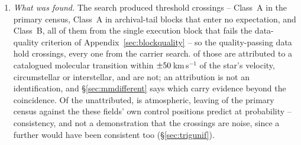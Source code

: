 \begin{enumerate}[leftmargin=1.6em,itemsep=4pt,topsep=4pt,parsep=0pt]
\item \emph{What was found.} The search produced \EvNCrossRaw{} threshold
crossings -- \CkNCrossCenA{} Class~A in the primary census,
\CeNTailCrossWord{} Class~A in archival-tail blocks that enter no expectation,
and \PrFlagXrossWord{} Class~B, all of them from the single execution block
that fails the data-quality criterion of Appendix~\ref{sec:blockquality} -- so
the quality-passing data hold \EvNCrossQp{} crossings, every one from the
carrier search. \EvNAttrQp{} of those are attributed to a catalogued molecular
transition within $\pm50$\,km\,s$^{-1}$ of the star's velocity,
circumstellar or interstellar, and \EvNUnattrQp{} are not; an attribution is
not an identification, and \S\ref{sec:mmdifferent} says which carry evidence
beyond the coincidence. Of the unattributed, \CeTlObsCutWord{} is atmospheric,
leaving \CeObs{} of the primary census against the \CeExp{} these fields' own
control positions predict at probability \CeProbNull{} -- consistency, and not
a demonstration that the crossings are noise, since a further \CeAddLim{} would
have been consistent too (\S\ref{sec:trigunif}).


\end{enumerate}

